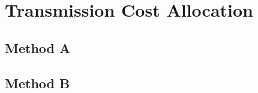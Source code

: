 \documentclass[journal]{IEEEtran} %
\begin{document}










\newpage

\section{Transmission Cost Allocation}












\subsection{Method A}











\subsection{Method B}
\end{document}
